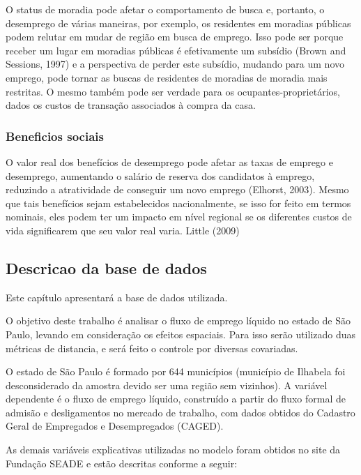 \documentclass[]{article}
\begin{document}
O status de moradia pode afetar o comportamento de busca e, portanto, o
desemprego de várias maneiras, por exemplo, os residentes em moradias
públicas podem relutar em mudar de região em busca de emprego. Isso pode
ser porque receber um lugar em moradias públicas é efetivamente um
subsídio (Brown and Sessions, 1997) e a perspectiva de perder este
subsídio, mudando para um novo emprego, pode tornar as buscas de
residentes de moradias de moradia mais restritas. O mesmo também pode
ser verdade para os ocupantes-proprietários, dados os custos de
transação associados à compra da casa.

\subsubsection{Beneficios sociais}\label{beneficios-sociais}

O valor real dos benefícios de desemprego pode afetar as taxas de
emprego e desemprego, aumentando o salário de reserva dos candidatos à
emprego, reduzindo a atratividade de conseguir um novo emprego (Elhorst,
2003). Mesmo que tais benefícios sejam estabelecidos nacionalmente, se
isso for feito em termos nominais, eles podem ter um impacto em nível
regional se os diferentes custos de vida significarem que seu valor real
varia. Little (2009)

\subsection{Descricao da base de
dados}\label{descricao-da-base-de-dados}

Este capítulo apresentará a base de dados utilizada.

O objetivo deste trabalho é analisar o fluxo de emprego líquido no
estado de São Paulo, levando em consideração os efeitos espaciais. Para
isso serão utilizado duas métricas de distancia, e será feito o controle
por diversas covariadas.

O estado de São Paulo é formado por 644 municípios (município de
Ilhabela foi desconsiderado da amostra devido ser uma região sem
vizinhos). A variável dependente é o fluxo de emprego líquido,
construído a partir do fluxo formal de admisão e desligamentos no
mercado de trabalho, com dados obtidos do Cadastro Geral de Empregados e
Desempregados (CAGED).

As demais variáveis explicativas utilizadas no modelo foram obtidos no
site da Fundação SEADE e estão descritas conforme a seguir:
\end{document}
